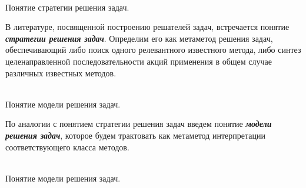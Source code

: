 	

\begin{frame}{\\Понятие стратегии решения задач.}
	\topline
	\justifying
    \begin{SCn}
    В литературе, посвященной построению решателей задач, встречается понятие \textbf{\textit{стратегии решения задач}}. Определим его как метаметод решения задач, обеспечивающий либо поиск одного релевантного известного метода, либо синтез целенаправленной последовательности акций применения в общем случае различных известных методов. 
    \end{SCn}
\end{frame}

\begin{frame}{\\Понятие модели решения задач.}
	\topline
	\justifying
    \begin{SCn}
    По аналогии с понятием стратегии решения задач введем понятие \textbf{\textit{модели решения задач}}, которое будем трактовать как метаметод интерпретации соответствующего класса методов.
    \end{SCn}
\end{frame}

\begin{frame}{\\Понятие модели решения задач.}
	\topline
	\justifying
    \begin{SCn}
    \end{SCn}
\end{frame}

